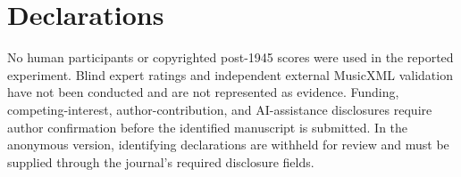\section*{Declarations}

No human participants or copyrighted post-1945 scores were used in the reported experiment. Blind expert ratings and independent external MusicXML validation have not been conducted and are not represented as evidence. Funding, competing-interest, author-contribution, and AI-assistance disclosures require author confirmation before the identified manuscript is submitted. In the anonymous version, identifying declarations are withheld for review and must be supplied through the journal's required disclosure fields.
